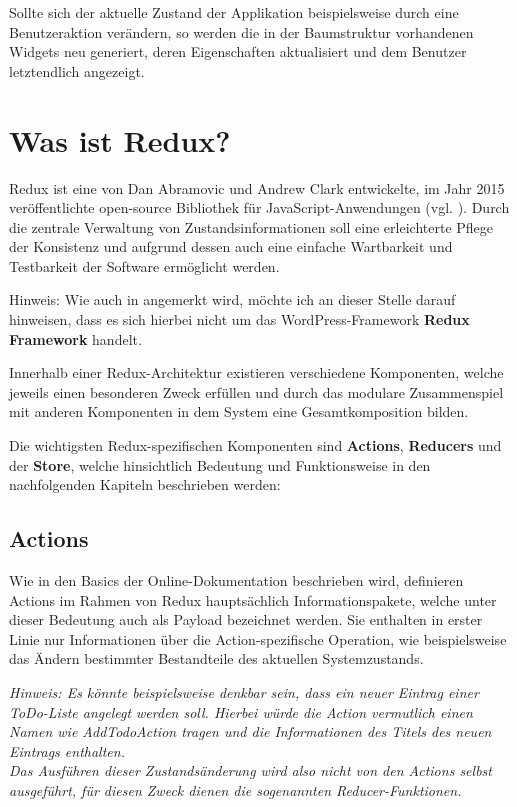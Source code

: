 \documentclass[bibliography=totoc,listof=totoc,BCOR=5mm,DIV=12,oneside]{scrbook}
\begin{document}
\par Sollte sich der aktuelle Zustand der Applikation beispielsweise durch eine Benutzeraktion verändern, so werden die in der Baumstruktur vorhandenen Widgets neu generiert, deren Eigenschaften aktualisiert und dem Benutzer letztendlich angezeigt.

\newpage		
\section{Was ist Redux?}
\par Redux ist eine von Dan Abramovic und Andrew Clark entwickelte, im Jahr 2015 veröffentlichte  open-source Bibliothek für JavaScript-Anwendungen (vgl. \citep{ReduxWiki}). Durch die zentrale Verwaltung von Zustandsinformationen soll eine erleichterte Pflege der Konsistenz und aufgrund dessen auch eine \grqq einfache\grqq{} Wartbarkeit und Testbarkeit der Software ermöglicht werden. \citep[vgl. Abschnitt Read Me]{ReduxReadMe}
\par \bigskip Hinweis: Wie auch in \citep[vgl. Abschnitt Read Me]{ReduxReadMe} angemerkt wird, möchte ich an dieser Stelle darauf hinweisen, dass es sich hierbei nicht um das WordPress-Framework \textbf{Redux Framework}\citep{WordPressRedux} handelt.

\par Innerhalb einer Redux-Architektur existieren verschiedene Komponenten, welche jeweils einen besonderen Zweck erfüllen und durch das modulare Zusammenspiel mit anderen Komponenten in dem System eine Gesamtkomposition bilden.
\par \bigskip Die wichtigsten Redux-spezifischen Komponenten sind \textbf{Actions}, \textbf{Reducers} und der \textbf{Store}, welche hinsichtlich Bedeutung und Funktionsweise in den nachfolgenden Kapiteln beschrieben werden:

\subsection{Actions}
\par Wie in den Basics der Online-Dokumentation \citep{ReduxActions} beschrieben wird, definieren Actions im Rahmen von Redux hauptsächlich Informationspakete, welche unter dieser Bedeutung auch als \grqq Payload\grqq{} bezeichnet werden. Sie enthalten in erster Linie nur Informationen über die Action-spezifische Operation, wie beispielsweise das Ändern bestimmter Bestandteile des aktuellen Systemzustands.
\par \bigskip \textit{Hinweis: Es könnte beispielsweise denkbar sein, dass ein neuer Eintrag einer ToDo-Liste angelegt werden soll. Hierbei würde die Action vermutlich einen Namen wie \grqq AddTodoAction\grqq{} tragen und die Informationen des Titels des neuen Eintrags enthalten. \\
Das Ausführen dieser Zustandsänderung wird also nicht von den Actions selbst ausgeführt, für diesen Zweck dienen die sogenannten Reducer-Funktionen.}
\end{document}
